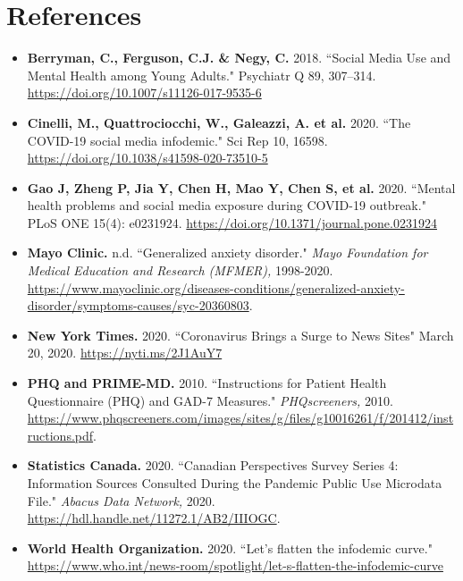 \documentclass{article}[12pt]
\begin{document}
    
    \section*{References}
    \renewcommand{\labelitemi}{$\triangleright$}
    
    \begin{itemize}
        
        \item
        \textbf{Berryman, C., Ferguson, C.J. \& Negy, C.} 2018. ``Social Media Use and Mental Health among Young Adults." Psychiatr Q 89, 307–314.
        \url{https://doi.org/10.1007/s11126-017-9535-6}
        
        \item
        \textbf{Cinelli, M., Quattrociocchi, W., Galeazzi, A. et al.} 2020. ``The COVID-19 social media infodemic." Sci Rep 10, 16598. \url{https://doi.org/10.1038/s41598-020-73510-5}
        
        \item
        \textbf{Gao J, Zheng P, Jia Y, Chen H, Mao Y, Chen S, et al.} 2020. ``Mental health problems and social media exposure during COVID-19 outbreak." PLoS ONE 15(4): e0231924. \url{https://doi.org/10.1371/journal.pone.0231924}
        
        
        \item
        \textbf{Mayo Clinic.} n.d. ``Generalized anxiety disorder." \textit{Mayo Foundation for Medical Education and Research (MFMER),} 1998-2020. \url{https://www.mayoclinic.org/diseases-conditions/generalized-anxiety-disorder/symptoms-causes/syc-20360803}.
        
        \item
        \textbf{New York Times.} 2020. ``Coronavirus Brings a Surge to News Sites" March 20, 2020. \url{https://nyti.ms/2J1AuY7}
        
        \item
        \textbf{PHQ and PRIME-MD.} 2010. ``Instructions for Patient Health Questionnaire (PHQ) and GAD-7 Measures." \textit{PHQscreeners,} 2010. \url{https://www.phqscreeners.com/images/sites/g/files/g10016261/f/201412/instructions.pdf}.
        
        \item
        \textbf{Statistics Canada.} 2020. ``Canadian Perspectives Survey Series 4: Information Sources Consulted During the Pandemic Public Use Microdata File."
        \textit{Abacus Data Network,} 2020. \url{https://hdl.handle.net/11272.1/AB2/IIIOGC}.
        
        \item
        \textbf{World Health Organization.} 2020. ``Let’s flatten the infodemic curve." \url{https://www.who.int/news-room/spotlight/let-s-flatten-the-infodemic-curve}

    \end{itemize}
    
\end{document}
